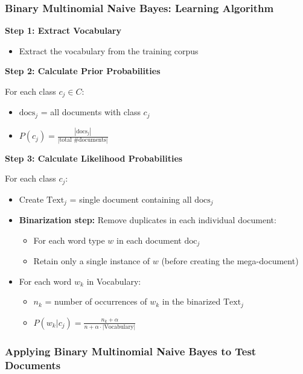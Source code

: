 \documentclass[11pt,a4paper]{article}
\theoremstyle{definition}
\theoremstyle{plain}
\theoremstyle{remark}
\begin{document}
\subsubsection{Binary Multinomial Naive Bayes: Learning Algorithm}

\textbf{Step 1: Extract Vocabulary}
\begin{itemize}
    \item Extract the vocabulary from the training corpus
\end{itemize}

\textbf{Step 2: Calculate Prior Probabilities}

For each class $c_j \in C$:
\begin{itemize}
    \item $\text{docs}_j$ = all documents with class $c_j$
    \item $P(c_j) = \frac{|\text{docs}_j|}{|\text{total \# documents}|}$
\end{itemize}

\textbf{Step 3: Calculate Likelihood Probabilities}

For each class $c_j$:
\begin{itemize}
    \item Create $\text{Text}_j$ = single document containing all $\text{docs}_j$
    \item \textbf{Binarization step:} Remove duplicates in each individual document:
    \begin{itemize}
        \item For each word type $w$ in each document $\text{doc}_j$
        \item Retain only a single instance of $w$ (before creating the mega-document)
    \end{itemize}
    \item For each word $w_k$ in Vocabulary:
    \begin{itemize}
        \item $n_k$ = number of occurrences of $w_k$ in the binarized $\text{Text}_j$
        \item $P(w_k | c_j) = \frac{n_k + \alpha}{n + \alpha \cdot |\text{Vocabulary}|}$
    \end{itemize}
\end{itemize}

\subsubsection{Applying Binary Multinomial Naive Bayes to Test Documents}
\end{document}
